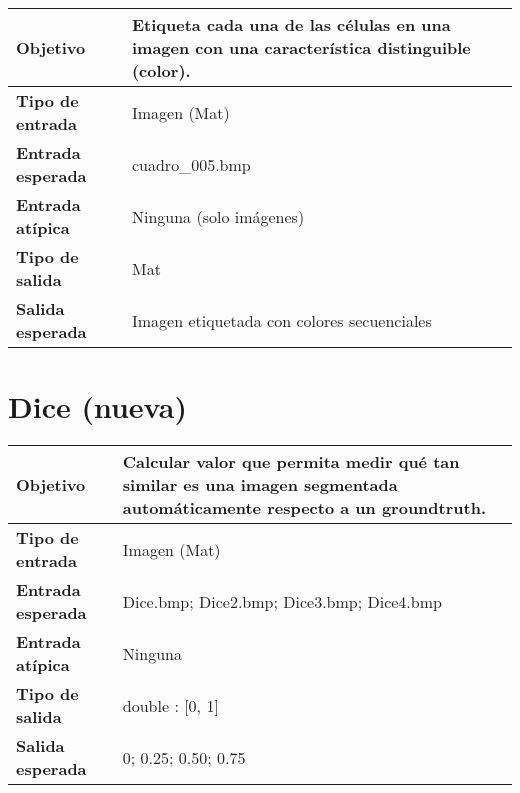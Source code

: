 \documentclass{scrreprt}
\begin{document}
\vspace{0.3cm}
\begin{center}
    \begin{tabular}{|p{4.0cm}|p{9.0cm}|}
        \hline
	    \textbf{Objetivo} & Etiqueta cada una de las células en una imagen con una característica distinguible (color). \\
        \hline
	    \textbf{Tipo de entrada} & Imagen (Mat) \\
        \hline
	    \textbf{Entrada esperada} & cuadro_005.bmp \\
        \hline
	    \textbf{Entrada atípica} & Ninguna (solo imágenes) \\
        \hline
	    \textbf{Tipo de salida} & Mat \\
        \hline
	    \textbf{Salida esperada} & Imagen etiquetada con colores secuenciales \\
        \hline        
    \end{tabular}
\end{center}


\section{Dice (nueva)}

\vspace{0.3cm}
\begin{center}
    \begin{tabular}{|p{4.0cm}|p{9.0cm}|}
        \hline
	    \textbf{Objetivo} & Calcular valor que permita medir qué tan similar es una imagen segmentada automáticamente respecto a un groundtruth. \\
        \hline
	    \textbf{Tipo de entrada} & Imagen (Mat) \\
        \hline
	    \textbf{Entrada esperada} & Dice.bmp; Dice2.bmp; Dice3.bmp; Dice4.bmp \\
        \hline
	    \textbf{Entrada atípica} & Ninguna \\
        \hline
		\textbf{Tipo de salida} & double : [0, 1] \\
        \hline
	    \textbf{Salida esperada} & 0; 0.25; 0.50; 0.75 \\
        \hline        
    \end{tabular}
\end{center}
\end{document}
